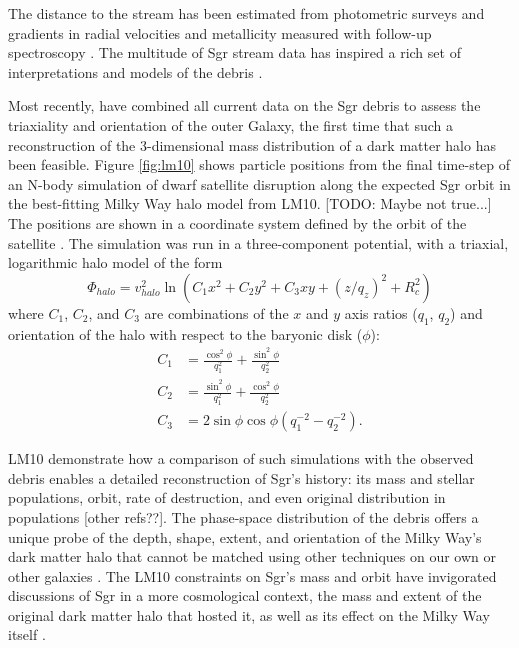 \documentclass[preprint]{aastex}
\begin{document}
The distance to the stream has been estimated from photometric surveys
\citep[e.g.,][]{martinezdelgado2004} and gradients in radial
velocities and metallicity measured with follow-up spectroscopy
\citep[e.g.,][]{majewski2004, vivas2005, bellazzini2006, chou2007,
  chou2010, keller2010, carlin2012}. The multitude of Sgr stream data
has inspired a rich set of interpretations and models of the debris
\citep[e.g.,][]{johnston1999, helmi2004, law2005, fellhauer2006,
  law2010}.

Most recently, \citet[][hereafter LM10]{law2010} have combined all
current data on the Sgr debris to assess the triaxiality and orientation
of the outer Galaxy, the first time that such a reconstruction of
the 3-dimensional mass distribution of a dark matter halo has been
feasible. Figure \ref{fig:lm10} shows particle positions from the final time-step of an N-body simulation of dwarf satellite disruption along the expected Sgr
orbit in the best-fitting Milky Way halo model from LM10. [TODO: Maybe not true...] The positions are shown in a coordinate system defined
by the orbit of the satellite \citep{majewski2004}. The
simulation was run in a three-component potential, with a triaxial,
logarithmic halo model of the form
\begin{equation}
  \Phi_{halo} = v_{halo}^2 \ln(C_1 x^2 + C_2 y^2 + C_3 xy + (z/q_z)^2 + R_c^2)
\end{equation}
where $C_1$, $C_2$, and $C_3$ are combinations of the $x$ and $y$ axis ratios ($q_1$, $q_2$) and orientation of the halo with respect to the baryonic disk ($\phi$):
\begin{align}
  C_1 &= \frac{\cos^2\phi}{q_1^2} + \frac{\sin^2\phi}{q_2^2}\\
  C_2 &= \frac{\sin^2\phi}{q_1^2} + \frac{\cos^2\phi}{q_2^2}\\
  C_3 &= 2\sin\phi\cos\phi \left(q_1^{-2} - q_2^{-2}\right).
\end{align}

LM10 demonstrate how a comparison of such simulations with the
observed debris enables a detailed reconstruction of Sgr's history:  
its mass and stellar populations, orbit, rate of destruction, and
even original distribution in populations [other refs??]. The phase-space distribution of the debris offers a unique probe of
the depth, shape, extent, and orientation of the Milky Way's dark
matter halo that cannot be matched using other techniques on our own
or other galaxies \citep[e.g.,][]{ibata2001}. The LM10 constraints on
Sgr's mass and orbit have invigorated discussions of Sgr in a more
cosmological context, the mass and extent of the original dark matter
halo that hosted it, as well as its effect on the Milky Way itself
\citep{bailin2003,purcell2011,micheldansac2011,gomez2012}.
\end{document}
